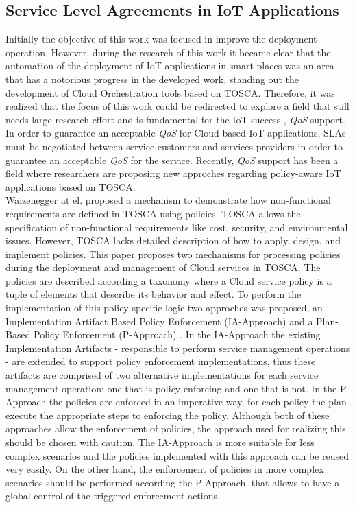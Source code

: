 \subsection{Service Level Agreements in IoT Applications}
\label{sub:subsection label}
Initially the objective of this work was focused in improve the deployment operation. However, during the research of this work it became clear that the automation of the deployment of IoT applications
in smart places was an area that has a notorious progress in the developed work, standing out the development of Cloud Orchestration tools based on TOSCA. Therefore, it was realized that the focus of
this work could be redirected to explore a field that still needs large research effort and is fundamental for the IoT success \cite{atzori2010internet}, \textit{QoS} support.
In order to guarantee an acceptable \textit{QoS} for Cloud-based IoT applications, SLAs must be negotiated between service customers and services providers in order to guarantee an acceptable \textit{QoS}
for the service. Recently, \textit{QoS} support has been a field where researchers are proposing new approches regarding policy-aware IoT applications based on TOSCA.\\

Waizenegger at el. \cite{waizenegger2013policy4tosca} proposed a mechanism to demonstrate how non-functional requirements are defined in TOSCA using policies. TOSCA allows the specification of non-functional
requirements like cost, security, and environmental issues. However, TOSCA lacks detailed description of how to apply, design, and implement policies. This paper proposes two mechanisms for processing
policies during the deployment and management of Cloud services in TOSCA. The policies are described according a taxonomy where a Cloud service policy is a tuple of elements that describe its behavior and effect.
To perform the implementation of this policy-specific logic two approches was proposed, an Implementation Artifact Based Policy Enforcement (IA-Approach) and a Plan-Based Policy Enforcement (P-Approach) \cite{waizenegger2013policy4tosca}.
In the IA-Approach the existing Implementation Artifacts - responsible to perform service management operations - are extended to support policy enforcement implementations, thus these artifacts are comprised
of two alternative implementations for each service management operation: one that is policy enforcing and one that is not. In the P-Approach the policies are enforced in an imperative way, for each policy the plan
execute the appropriate steps to enforcing the policy. Although both of these approaches allow the enforcement of policies, the approach used for realizing this should be chosen with caution. The IA-Approach is
more suitable for less complex scenarios and the policies implemented with this approach can be reused very easily. On the other hand, the enforcement of policies in more complex scenarios should be performed according
the P-Approach, that allows to have a global control of the triggered enforcement actions.\\

